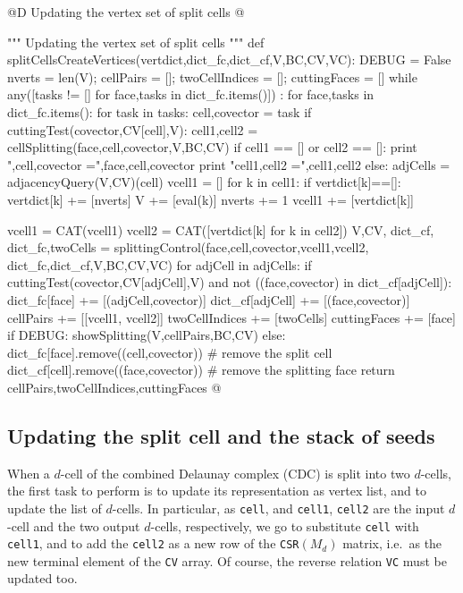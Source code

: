 \documentclass[11pt,oneside]{article}	%
\begin{document}
@D Updating the vertex set  of split cells
@{""" Updating the vertex set of split cells """
def splitCellsCreateVertices(vertdict,dict_fc,dict_cf,V,BC,CV,VC):
	DEBUG = False
	nverts = len(V); cellPairs = []; twoCellIndices = []; cuttingFaces = []
	while any([tasks != [] for face,tasks in dict_fc.items()]) : 
		for face,tasks in dict_fc.items():
			for task in tasks:
				cell,covector = task
				if cuttingTest(covector,CV[cell],V):
					cell1,cell2 = cellSplitting(face,cell,covector,V,BC,CV)
					if cell1 == [] or cell2 == []:
						print "\nface,cell,covector =",face,cell,covector
						print "cell1,cell2 =",cell1,cell2
					else:
						adjCells = adjacencyQuery(V,CV)(cell)
						vcell1 = []
						for k in cell1:
							if vertdict[k]==[]: 
								vertdict[k] += [nverts]
								V += [eval(k)]
								nverts += 1
							vcell1 += [vertdict[k]]
						
						vcell1 = CAT(vcell1)
						vcell2 = CAT([vertdict[k] for k in cell2])						
						V,CV, dict_cf, dict_fc,twoCells = splittingControl(face,cell,covector,vcell1,vcell2, 
														dict_fc,dict_cf,V,BC,CV,VC)
						for adjCell in adjCells:
							if cuttingTest(covector,CV[adjCell],V) and not ((face,covector) in dict_cf[adjCell]):
								dict_fc[face] += [(adjCell,covector)] 
								dict_cf[adjCell] += [(face,covector)] 
						cellPairs += [[vcell1, vcell2]]
						twoCellIndices += [twoCells]
						cuttingFaces += [face]
					if DEBUG: showSplitting(V,cellPairs,BC,CV)
				else:
					dict_fc[face].remove((cell,covector))   # remove the split cell
					dict_cf[cell].remove((face,covector))   # remove the splitting face
	return cellPairs,twoCellIndices,cuttingFaces
@}


\subsection{Updating the split cell and the stack of seeds}

When a $d$-cell of the combined Delaunay complex (CDC) is split into two $d$-cells, the first task to perform is to update its representation as vertex list, and to update the list of $d$-cells. In particular, as \texttt{cell}, and \texttt{cell1}, \texttt{cell2} are the input $d$-cell and the two output $d$-cells, respectively, we go to substitute \texttt{cell} with \texttt{cell1}, and to add the \texttt{cell2} as a new row of the \texttt{CSR}$(M_d)$ matrix, i.e.~as the new terminal element of the \texttt{CV} array. Of course, the reverse relation \texttt{VC} must be updated too.
\end{document}
